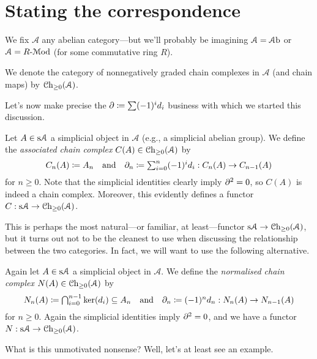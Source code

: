 
\renewcommand{\A}{\mathcal{A}}

\section{Stating the correspondence}

We fix $\A$ any abelian category---but we'll probably be imagining $\A
= \Ab$ or $\A = R\text{-}\Mod$ (for some commutative ring $R$).

\begin{notation}
  We denote the category of nonnegatively graded chain complexes in
  $\A$ (and chain maps) by $\Ch_{\ge 0}(\A)$.
\end{notation}

Let's now make precise the $\partial \coloneqq \sum (-1)^i d_i$ business
with which we started this discussion.

\begin{definition}
  Let $A \in \s\A$ a simplicial object in $\A$ (e.g., a simplicial
  abelian group). We define the \textit{associated chain complex}
  $C(A) \in \Ch_{\ge 0}(\A)$ by
  \[
  \textstyle{C_n(A) \coloneqq A_n \quad\text{and}\quad \partial_n
    \coloneqq \sum_{i=0}^n (-1)^i d_i : C_n(A) \to C_{n-1}(A)}
  \]
  for $n \ge 0$. Note that the simplicial identities clearly imply
  $\partial^2 = 0$, so $C(A)$ is indeed a chain complex. Moreover, this
  evidently defines a functor $C : \s\A \to \Ch_{\ge 0}(\A)$.
\end{definition}

This is perhaps the most natural---or familiar, at least---functor
$\s\A \to \Ch_{\ge 0}(\A)$, but it turns out not to be the cleanest to
use when discussing the relationship between the two categories. In
fact, we will want to use the following alternative.

\begin{definition}
  Again let $A \in \s\A$ a simplicial object in $\A$. We define the
  \textit{normalised chain complex} $N(A) \in \Ch_{\ge 0}(\A)$ by
  \[
  \textstyle{N_n(A) \coloneqq \bigcap_{i=0}^{n-1} \ker(d_i) \subseteq
    A_n \quad\text{and}\quad \partial_n \coloneqq (-1)^n d_n : N_n(A) \to
    N_{n-1}(A)}
  \]
  for $n \ge 0$. Again the simplicial identities imply $\partial^2 = 0$,
  and we have a functor $N : \s\A \to \Ch_{\ge 0}(\A)$.
\end{definition}

What is this unmotivated nonsense? Well, let's at least see an example.

